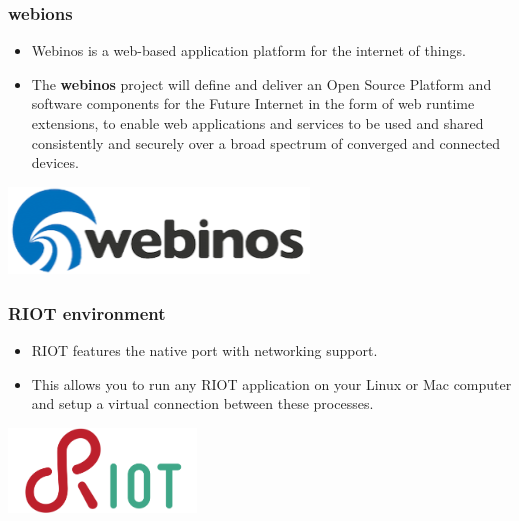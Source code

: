 \documentclass{beamer}
\begin{document}
\begin{frame}
	\frametitle{webions}
	\begin{itemize}
		\item Webinos is a web-based application platform for the internet of things.
		\item The \textbf{webinos} project will define and deliver an Open Source Platform and software components for the Future Internet in the form of web runtime extensions, to enable web applications and services to be used and shared consistently and securely over a broad spectrum of converged and connected devices.
	\end{itemize}
	\vspace{.1cm}
	\hspace*{3cm} \includegraphics[width=8cm]{figs/webinos-logo.png}
\end{frame}

\begin{frame}
	\frametitle{RIOT environment}
	\vspace{.1cm}
	\begin{itemize}
		\justifying
		\item RIOT features the native port with networking support.
		\item This allows you to run any RIOT application on your Linux or Mac computer and setup a virtual connection between these processes.
	\end{itemize}
	\vspace{.5cm}
	\hspace*{5.5cm} \includegraphics[width=5cm]{figs/riot-logo.png}
\end{frame}
\end{document}
